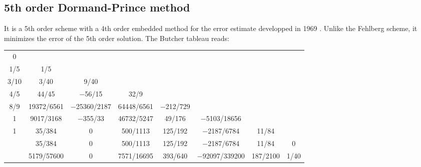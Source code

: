 \documentclass{report}
\begin{document}
\begin{appendices}
	
	\section{5th order Dormand-Prince method}
	It is a 5th order scheme with a 4th order embedded method for the error estimate developped in 1969 \cite{RK-DormandPrince}. Unlike the Fehlberg scheme, it minimizes the error of the 5th order solution. The Butcher tableau reads:
	
	\begin{center}
	\begin{tabular}{c | c c c c c c c}
	0 & & & & & & & \\
	1/5 & 1/5 & & & & & & \\
	3/10 & 3/40 & 9/40 & & & & & \\
	4/5 & 44/45 & −56/15 & 32/9 & & & & \\
	8/9 & 19372/6561 & −25360/2187 & 64448/6561 & −212/729 & & & \\
	1 & 9017/3168 & −355/33 & 46732/5247 & 49/176 & −5103/18656 & & \\
	1 & 35/384 & 0 & 500/1113 & 125/192 & −2187/6784 & 11/84 & \\ \hline	
	& 35/384 & 0 & 500/1113 & 125/192 & −2187/6784 & 11/84 & 0 \\
	& 5179/57600 & 0 & 7571/16695 & 393/640 & −92097/339200 & 187/2100 & 1/40 
	\end{tabular}
	\end{center}

	

\end{appendices}
\end{document}
